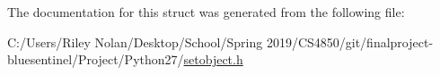 The documentation for this struct was generated from the following file\+:\begin{DoxyCompactItemize}
\item 
C\+:/\+Users/\+Riley Nolan/\+Desktop/\+School/\+Spring 2019/\+C\+S4850/git/finalproject-\/bluesentinel/\+Project/\+Python27/\mbox{\hyperlink{setobject_8h}{setobject.\+h}}\end{DoxyCompactItemize}
